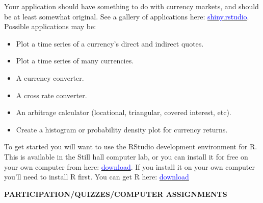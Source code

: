 \documentclass{article}
\begin{document}
Your application should have something to do with currency markets, and should be at least somewhat original.  See a gallery of applications here:  \href{http://shiny.rstudio.com/}{\textcolor{blue}{shiny.rstudio}}. Possible applications may be:
\begin{itemize}
\item Plot a time series of a currency's direct and indirect quotes.
\item Plot a time series of many currencies.
\item A currency converter.
\item A cross rate converter.
\item An arbitrage calculator (locational, triangular, covered interest, etc).
\item Create a histogram or probability density plot for currency returns.
\end{itemize}
To get started you will want to use the RStudio development environment for R.  This is available in the Still hall computer lab, or you can install it for free on your own computer from here:  \href{https://www.rstudio.com/products/rstudio/download/}{\textcolor{blue}{download}}.  If you install it on your own computer you'll need to install R first.  You can get R here:  \href{https://cran.r-project.org/}{\textcolor{blue}{download}}
\\
\begin{center}
{\bf PARTICIPATION/QUIZZES/COMPUTER ASSIGNMENTS}
\end{center}
\end{document}
